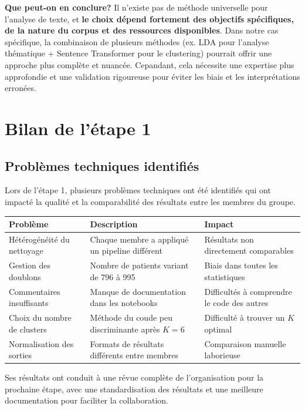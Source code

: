\documentclass[12pt,a4paper]{report}
\begin{document}
\textbf{Que peut-on en conclure?} Il n'existe pas de méthode universelle pour l'analyse de texte, et \textbf{le choix dépend fortement des objectifs spécifiques, 
de la nature du corpus et des ressources disponibles}. Dans notre cas spécifique, la combinaison de plusieurs méthodes (ex. LDA pour l'analyse thématique + Sentence Transformer pour le clustering) 
pourrait offrir une approche plus complète et nuancée. 
Cepandant, cela nécessite une expertise plus approfondie et une validation rigoureuse pour éviter les biais et les interprétations erronées.

\chapter{Bilan de l'étape 1}

\section{Problèmes techniques identifiés}

Lors de l'étape 1, plusieurs problèmes techniques ont été identifiés qui ont impacté la qualité et la comparabilité des résultats entre les membres du groupe.

\begin{center}
\begin{tabularx}{\textwidth}{@{}>{\raggedright\arraybackslash}p{2.8cm}X X@{}}
\toprule
\textbf{Problème} & \textbf{Description} & \textbf{Impact} \\
\midrule
Hétérogénéité du nettoyage
  & Chaque membre a appliqué un pipeline différent
  & Résultats non directement comparables \\
Gestion des doublons
  & Nombre de patients variant de 796 à 995
  & Biais dans toutes les statistiques \\
Commentaires insuffisants
  & Manque de documentation dans les notebooks
  & Difficultés à comprendre le code des autres \\
Choix du nombre de clusters
  & Méthode du coude peu discriminante après $K = 6$
  & Difficulté à trouver un $K$ optimal \\
Normalisation des sorties
  & Formats de résultats différents entre membres
  & Comparaison manuelle laborieuse \\
\bottomrule
\end{tabularx}
\end{center}

Ses résultats ont conduit à une révue complète de l'organisation pour la prochaine étape, avec une standardisation des résultats et une meilleure documentation pour faciliter la collaboration.
\end{document}

